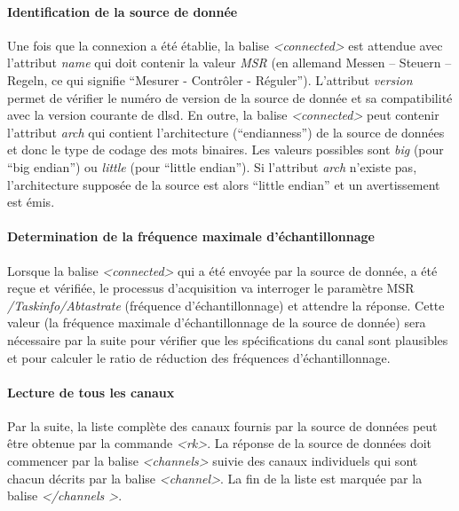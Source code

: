 \documentclass[a4paper,12pt,BCOR6mm,bibtotoc,idxtotoc]{scrbook}
\begin{document}
\paragraph{Identification de la source de donn\'ee}
Une fois que la connexion a \'et\'e \'etablie, la balise
\textit{\textless connected\textgreater} est attendue avec l'attribut
\textit{name} qui doit contenir la valeur \textit{MSR} (en allemand
\glqq Messen -- Steuern -- Regeln\grqq, ce qui signifie
``Mesurer - Contr\^oler - R\'eguler''). L'attribut \textit{version} permet
de v\'erifier le num\'ero de version de la source de donn\'ee et sa
compatibilit\'e avec la version courante de dlsd.  En outre, la balise
\textit{\textless connected\textgreater} peut contenir l'attribut
\textit{arch} qui contient l'architecture
(``endianness'') de la source de donn\'ees et donc
le type de codage des mots binaires. Les valeurs possibles sont
\textit{big} (pour ``big endian'') ou \textit{little} (pour ``little
endian''). Si l'attribut \textit{arch} n'existe pas, l'architecture
suppos\'ee de la source est alors ``little endian'' et un
avertissement est \'emis.

\paragraph{Determination de la fr\'equence maximale d'\'echantillonnage}
Lorsque la balise \textit{\textless connected\textgreater} qui a
\'et\'e envoy\'ee par la source de donn\'ee, a \'et\'e re\c cue et
v\'erifi\'ee, le processus d'acquisition va interroger le param\`etre
MSR \textit{/Taskinfo/Abtastrate} (fr\'equence d'\'echantillonnage) et
attendre la r\'eponse.  Cette valeur (la fr\'equence maximale
d'\'echantillonnage de la source de donn\'ee) sera n\'ecessaire par la
suite pour v\'erifier que les sp\'ecifications du canal sont
plausibles et pour calculer le ratio de r\'eduction des fr\'equences
d'\'echantillonnage.

\paragraph{Lecture de tous les canaux}
Par la suite, la liste compl\`ete des canaux fournis par la source
de donn\'ees peut \^etre obtenue par la commande
\textit{\textless rk\textgreater}. La r\'eponse de la source de donn\'ees
doit commencer par la balise  \textit{\textless channels\textgreater}
suivie des canaux individuels qui sont chacun d\'ecrits par la balise
\textit{\textless channel\textgreater}.
La fin de la liste est marqu\'ee par la balise
\textit{\textless /channels \textgreater}.
\end{document}
